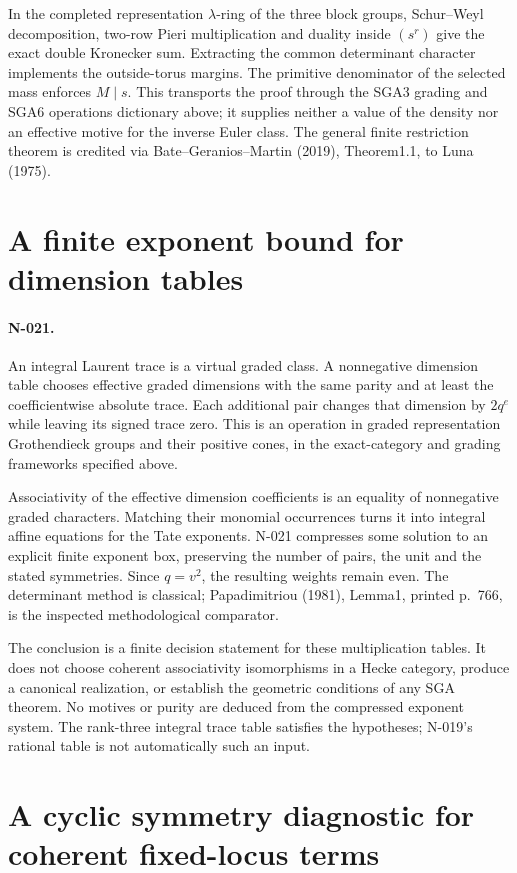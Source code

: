 In the completed representation $\lambda$-ring of the three block
groups, Schur--Weyl decomposition, two-row Pieri multiplication and
duality inside $(s^r)$ give the exact double Kronecker sum. Extracting
the common determinant character implements the outside-torus margins.
The primitive denominator of the selected mass enforces $M\mid s$.
This transports the proof through the SGA3 grading and SGA6 operations
dictionary above; it supplies neither a value of the density nor an
effective motive for the inverse Euler class. The general finite
restriction theorem is credited via Bate--Geranios--Martin (2019),
Theorem1.1, to Luna (1975).

\section{A finite exponent bound for dimension tables}
\paragraph{N-021.}
An integral Laurent trace is a virtual graded class. A nonnegative
dimension table chooses effective graded dimensions with the same
parity and at least the coefficientwise absolute trace. Each additional
pair changes that dimension by $2q^e$ while leaving its signed trace
zero. This is an operation in graded representation Grothendieck
groups and their positive cones, in the exact-category and grading
frameworks specified above.

Associativity of the effective dimension coefficients is an equality
of nonnegative graded characters. Matching their monomial occurrences
turns it into integral affine equations for the Tate exponents.
N-021 compresses some solution to an explicit finite exponent box,
preserving the number of pairs, the unit and the stated symmetries.
Since $q=v^2$, the resulting weights remain even. The determinant
method is classical; Papadimitriou (1981), Lemma1, printed p.~766,
is the inspected methodological comparator.

The conclusion is a finite decision statement for these multiplication
tables. It does not choose coherent associativity isomorphisms in a
Hecke category, produce a canonical realization, or establish the
geometric conditions of any SGA theorem. No motives or purity are
deduced from the compressed exponent system. The rank-three integral
trace table satisfies the hypotheses; N-019's rational table is not
automatically such an input.

\section{A cyclic symmetry diagnostic for coherent fixed-locus terms}
